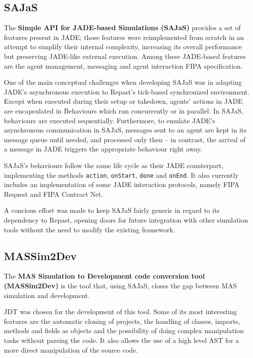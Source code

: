 \documentclass[9pt,a4paper]{extarticle}
\begin{document}
\begin{multicols}{2}
\subsection{SAJaS}

The \textbf{Simple API for JADE-based Simulations (SAJaS)} provides a set of features present in JADE; those features were reimplemented from scratch in an attempt to simplify their internal complexity, increasing its overall performance but preserving JADE-like external execution. Among these JADE-based features are the agent management, messaging and agent interaction FIPA specification. 

One of the main conceptual challenges when developing SAJaS was in adapting JADE's asynchronous execution to Repast's tick-based synchronized environment. Except when executed during their setup or takedown, agents' actions in JADE are encapsulated in Behaviours which run concurrently or in parallel. In SAJaS, behaviours are executed sequentially. Furthermore, to emulate JADE's asynchronous communication in SAJaS, messages sent to an agent are kept in its message queue until needed, and processed only then -- in contrast, the arrival of a message in JADE triggers the appropriate behaviour right away.

SAJaS's behaviours follow the same life cycle as their JADE counterpart, implementing the methods \texttt{action}, \texttt{onStart}, \texttt{done} and \texttt{onEnd}. It also currently includes an implementation of some JADE interaction protocols, namely FIPA Request and FIPA Contract Net.

A concious effort was made to keep SAJaS fairly generic in regard to its dependency to Repast, opening doors for future integration with other simulation tools without the need to modify the existing framework.

\subsection{MASSim2Dev}

The \textbf{MAS Simulation to Development code conversion tool (MASSim2Dev)} is the tool that, using SAJaS, closes the gap between MAS simulation and development.

JDT was chosen for the development of this tool. Some of its most interesting features are the automatic cloning of projects, the handling of classes, imports, methods and fields as objects and the possibility of doing complex manipulation tasks without parsing the code. It also allows the use of a high level AST for a more direct manipulation of the source code.


\end{multicols}
\end{document}
